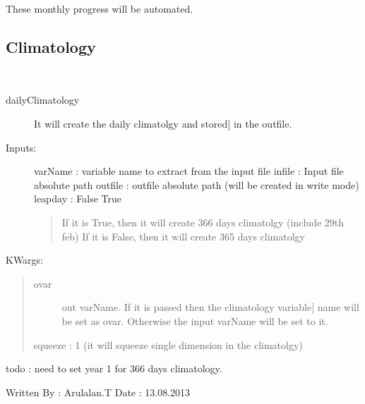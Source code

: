 \documentclass[letterpaper,10pt,english]{sphinxmanual}
\begin{document}
These monthly progress will be automated.


\subsection{Climatology}
\label{diagnosis:climatology}\label{diagnosis:module-climatology_utils}

\begin{fulllineitems}
\label{diagnosis:climatology_utils.dailyClimatology}~\begin{description}
\item[{dailyClimatology}] \leavevmode{[}It will create the daily climatolgy and stored{]}
in the outfile.

\item[{Inputs:}] \leavevmode
varName : variable name to extract from the input file
infile : Input file absolute path
outfile : outfile absolute path (will be created in write mode)
leapday : False \textbar{} True
\begin{quote}

If it is True, then it will create 366 days climatolgy
(include 29th feb)
If it is False, then it will create 365 days climatolgy
\end{quote}

\end{description}

KWargs:
\begin{quote}
\begin{description}
\item[{ovar}] \leavevmode{[}out varName. If it is passed then the climatology variable{]}
name will be set as ovar. Otherwise the input varName will
be set to it.

\end{description}

squeeze : 1 (it will squeeze single dimension in the climatolgy)
\end{quote}

todo : need to set year 1 for 366 days climatology.

Written By : Arulalan.T
Date : 13.08.2013

\end{fulllineitems}

\end{document}
